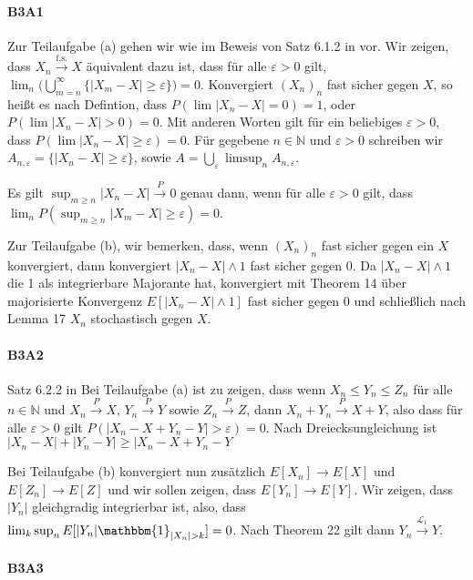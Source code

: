 \documentclass{article}
\begin{document}
\paragraph{B3A1}
Zur Teilaufgabe (a) gehen wir wie im Beweis von Satz 6.1.2 in \cite{hesse} vor.
Wir zeigen, dass $X_n\xrightarrow{\text{f.s.}}X$ äquivalent dazu ist, dass für alle $\varepsilon>0$ gilt, $\lim_n\bigl(\bigcup_{m=n}^\infty\{|X_m-X|\geq\varepsilon\}\bigr)=0$.
Konvergiert $(X_n)_n$ fast sicher gegen $X$, so heißt es nach Defintion, dass $P(\lim|X_n-X|=0)=1$, oder $P(\lim|X_n-X|>0)=0$.
Mit anderen Worten gilt für ein beliebiges $\varepsilon>0$, dass $P(\lim|X_n-X|\geq\varepsilon)=0$. %
Für gegebene $n\in\mathbb{N}$ und $\varepsilon>0$ schreiben wir $A_{n,\varepsilon}=\{|X_n-X|\geq\varepsilon\}$, sowie $A=\bigcup_{\varepsilon}\limsup_nA_{n,\varepsilon}$.

Es gilt $\sup_{m\geq n}|X_n-X|\xrightarrow{P}0$ genau dann, wenn für alle $\varepsilon>0$ gilt, dass $\lim_n P(\sup_{m\geq n}|X_m-X|\geq\varepsilon)=0$.

Zur Teilaufgabe (b), wir bemerken, dass, wenn $(X_n)_n$ fast sicher gegen ein $X$ konvergiert, dann konvergiert $|X_n-X|\wedge1$ fast sicher gegen 0.
Da $|X_n-X|\wedge1$ die 1 als integrierbare Majorante hat,  konvergiert mit Theorem 14 über majorisierte Konvergenz $E[|X_n-X|\wedge 1]$ fast sicher gegen 0 und schließlich nach Lemma 17 $X_n$ stochastisch gegen $X$.
\newpage
\paragraph{B3A2}
Satz 6.2.2 in \cite{Hesse}
Bei Teilaufgabe (a) ist zu zeigen, dass wenn $X_n\leq Y_n\leq Z_n$ für alle $n\in\mathbb{N}$ und $X_n\xrightarrow{P}X$, $Y_n\xrightarrow{P}Y$ sowie $Z_n\xrightarrow{P}Z$, dann $X_n+Y_n\xrightarrow{P}X+Y$, also dass für alle $\varepsilon>0$ gilt $P(|X_n-X+Y_n-Y|>\varepsilon)=0$.
Nach Dreiecksungleichung ist $|X_n-X|+|Y_n-Y|\geq|X_n-X+Y_n-Y$

Bei Teilaufgabe (b) konvergiert nun zusätzlich $E[X_n]\to E[X]$ und $E[Z_n]\to E[Z]$ und wir sollen zeigen, dass $E[Y_n]\to E[Y]$.
Wir zeigen, dass $|Y_n|$ gleichgradig integrierbar ist, also, dass $\lim_{k}\sup_{n}E[|Y_n|\mathbbm{1}_{|X_n|>k}]=0$.
Nach Theorem 22 gilt dann $Y_n\xrightarrow{\mathcal{L}_1}Y$.
\newpage
\paragraph{B3A3}
\newpage
\end{document}
